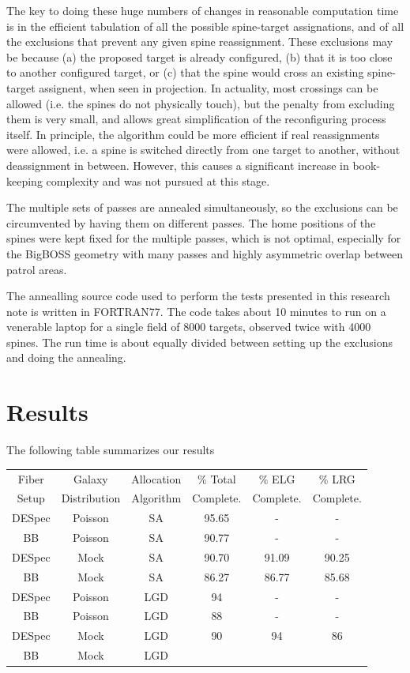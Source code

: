 \documentclass{article}
\begin{document}
The key to doing these huge numbers of changes in reasonable computation
time is in the efficient tabulation of all the possible spine-target
assignations, and of all the exclusions that prevent any given spine
reassignment. These exclusions may be because (a) the proposed target is
already configured, (b) that it is too close to another configured target,
or (c) that the spine would cross an existing spine-target assignent, when
seen in projection. In actuality, most crossings can be allowed (i.e. the
spines do not physically touch), but the penalty from excluding them is
very small, and allows great simplification of the reconfiguring process
itself. In principle, the algorithm could be more efficient if real
reassignments were allowed, i.e. a spine is switched directly from one
target to another, without deassignment in between. However, this causes a
significant increase in book-keeping complexity and was not pursued at
this stage.

The multiple sets of passes are annealed simultaneously, so the exclusions
can be circumvented by having them on different passes. The home positions
of the spines were kept fixed for the multiple passes, which is not
optimal, especially for the BigBOSS geometry with many passes and highly
asymmetric overlap between patrol areas. 

The annealling source code used to perform the tests presented in this
research note is written in FORTRAN77. The code takes about 10 minutes
to run on a venerable laptop for a single field of 8000 targets,
observed twice with 4000 spines. The run time is about equally divided
between setting up the exclusions and doing the annealing. 




\section{Results}

The following table summarizes our results

\begin{table}[!ht]
\begin{center}
\begin{tabular}{cccccc}\hline
Fiber & Galaxy & Allocation & \% Total & \% ELG & \% LRG\\
Setup & Distribution & Algorithm & Complete. &
Complete.&Complete.\\\hline  
DESpec & Poisson & SA & 95.65 & -& -\\
BB & Poisson & SA & 90.77 & -& -\\
DESpec & Mock & SA & 90.70 & 91.09 & 90.25 \\
BB & Mock & SA & 86.27 & 86.77 & 85.68\\
DESpec & Poisson & LGD & 94 & -& -\\
BB & Poisson & LGD & 88& -&-\\
DESpec & Mock & LGD & 90 & 94 & 86\\
BB & Mock & LGD & & &\\\hline
\end{tabular}
\end{center}
\label{Summary of the results.}
\end{table}
\end{document}
